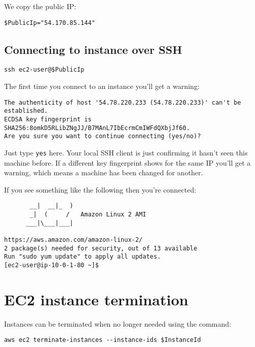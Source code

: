 We copy the public IP:
\begin{verbatim}
$PublicIp="54.170.85.144"
\end{verbatim}

\subsection{Connecting to instance over
SSH}\label{sec:connecting-to-instance-over-ssh}

\begin{verbatim}
ssh ec2-user@$PublicIp 
\end{verbatim}

The first time you connect to an instance you'll get a warning:

\begin{verbatim}
The authenticity of host '54.78.220.233 (54.78.220.233)' can't be established.
ECDSA key fingerprint is SHA256:8omkD5RLibZNgJJ/B7MAnL7IbEcrmCmIWFdQXbjJf60.
Are you sure you want to continue connecting (yes/no)?
\end{verbatim}

Just type \texttt{yes} here. Your local SSH client is just confirming it
hasn't seen this machine before. If a different key fingerprint shows
for the same IP you'll get a warning, which means a machine has been
changed for another.

If you see something like the following then you're connected:

\begin{verbatim}
       __|  __|_  )
       _|  (     /   Amazon Linux 2 AMI
      ___|\___|___|

https://aws.amazon.com/amazon-linux-2/
2 package(s) needed for security, out of 13 available
Run "sudo yum update" to apply all updates.
[ec2-user@ip-10-0-1-80 ~]$ 
\end{verbatim}

\section{EC2 instance termination}\label{ec2-instance-termination}

Instances can be terminated when no longer needed using the command:

\begin{verbatim}
aws ec2 terminate-instances --instance-ids $InstanceId
\end{verbatim}


